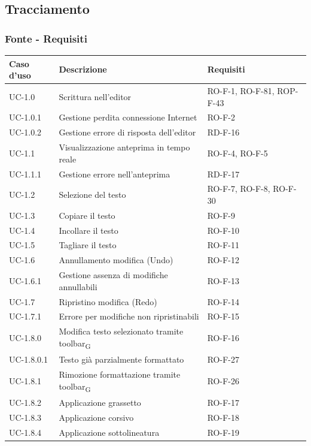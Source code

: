 \documentclass[11pt,a4paper]{article}
\newcommand{\gls}[1]{#1\textsubscript{G}}
\begin{document}
\newpage

\subsection{Tracciamento}
\subsubsection{Fonte - Requisiti}
\begin{longtable}{|p{}|p{}|>{\raggedright\arraybackslash}p{}|}
\hline
\textbf{Caso d'uso} & \textbf{Descrizione} & \textbf{Requisiti} \\
\hline
\endhead
UC-1.0 & Scrittura nell'editor & RO-F-1, RO-F-81, ROP-F-43 \\
\hline
UC-1.0.1 & Gestione perdita connessione Internet & RO-F-2 \\
\hline
UC-1.0.2 & Gestione errore di risposta dell'editor & RD-F-16 \\
\hline
UC-1.1 & Visualizzazione anteprima in tempo reale & RO-F-4, RO-F-5 \\
\hline
UC-1.1.1 & Gestione errore nell'anteprima & RD-F-17 \\
\hline
UC-1.2 & Selezione del testo & RO-F-7, RO-F-8, RO-F-30 \\
\hline
UC-1.3 & Copiare il testo & RO-F-9 \\
\hline
UC-1.4 & Incollare il testo & RO-F-10 \\
\hline
UC-1.5 & Tagliare il testo & RO-F-11 \\
\hline
UC-1.6 & Annullamento modifica (Undo) & RO-F-12 \\
\hline
UC-1.6.1 & Gestione assenza di modifiche annullabili & RO-F-13 \\
\hline
UC-1.7 & Ripristino modifica (Redo) & RO-F-14 \\
\hline
UC-1.7.1 & Errore per modifiche non ripristinabili & RO-F-15 \\
\hline
UC-1.8.0 & Modifica testo selezionato tramite \gls{toolbar} & RO-F-16 \\
\hline
UC-1.8.0.1 & Testo già parzialmente formattato & RO-F-27 \\
\hline
UC-1.8.1 & Rimozione formattazione tramite \gls{toolbar} & RO-F-26 \\
\hline
UC-1.8.2 & Applicazione grassetto & RO-F-17 \\
\hline
UC-1.8.3 & Applicazione corsivo & RO-F-18 \\
\hline
UC-1.8.4 & Applicazione sottolineatura & RO-F-19 \\

\end{longtable}
\end{document}
